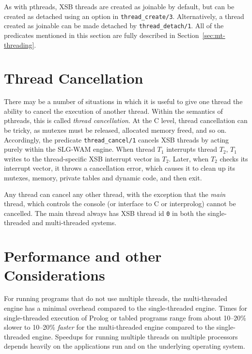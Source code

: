 %
As with pthreads, XSB threads are created as joinable by default, but
can be created as detached using an option in {\tt thread\_create/3}.
Alternatively, a thread created as joinable can be made detached by
{\tt thread\_detach/1}.  All of the predicates mentioned in this
section are fully described in Section~\ref{sec:mt-threading}.

\section{Thread Cancellation}
%
There may be a number of situations in which it is useful to give one
thread the ability to cancel the execution of another thread.  Within
the semantics of pthreads, this is called {\em thread cancellation}.
At the C level, thread cancellation can be tricky, as mutexes must be
released, allocated memory freed, and so on.  Accordingly, the
predicate {\tt thread\_cancel/1} cancels XSB threads by acting purely
within the SLG-WAM engine.  When thread $T_1$ interrupts thread $T_2$,
$T_1$ writes to the thread-specific XSB interrupt vector in $T_2$.
Later, when $T_2$ checks its interrupt vector, it throws a
cancellation error, which causes it to clean up its mutexes, memory,
private tables and dynamic code, and then exit.

Any thread can cancel any other thread, with the exception that the
{\em main} thread, which controls the console (or interface to C or
interprolog) cannot be cancelled.  The main thread always has XSB
thread id {\tt 0} in both the single-threaded and multi-threaded
systems.

\section{Performance and other Considerations}
%
For running programs that do not use multiple threads, the
multi-threaded engine has a minimal overhead compared to the
single-threaded engine.  Times for single-threaded execution of Prolog
or tabled programs range from about 10--20\% slower to 10--20\% {\em
  faster} for the multi-threaded engine compared to the
single-threaded engine.  Speedups for running multiple threads on
multiple processors depends heavily on the applications run and on the
underlying operating system.

